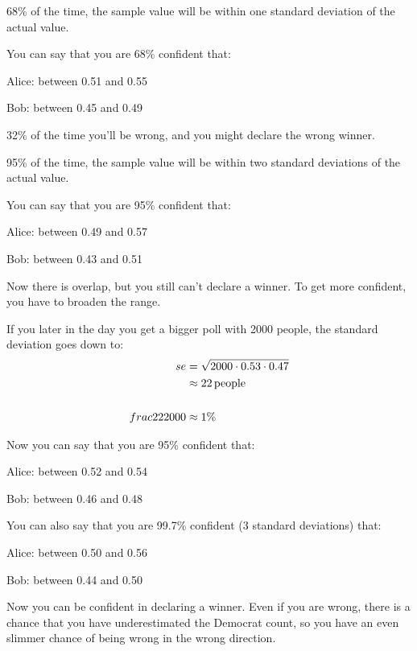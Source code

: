 \documentclass[landscape]{exam}
\begin{document}
  68\% of the time, the sample value will be within one standard deviation of
  the actual value. 
  
  You can say that you are 68\% confident that:
  \begin{itemize*}
    \item Alice: between 0.51 and 0.55
    \item Bob: between 0.45 and 0.49
  \end{itemize*}

  32\% of the time you'll be wrong, and you might declare the wrong winner.

  95\% of the time, the sample value will be within two standard deviations of
  the actual value. 
  
  You can say that you are 95\% confident that:
  \begin{itemize*}
    \item Alice: between 0.49 and 0.57
    \item Bob: between 0.43 and 0.51
  \end{itemize*}

  Now there is overlap, but you still can't declare a winner. To get more
  confident, you have to broaden the range.

  If you later in the day you get a bigger poll with 2000 people, the standard
  deviation goes down to:
  \begin{align*}
    se & = \sqrt{2000 \cdot 0.53 \cdot 0.47} \\
       & \approx \unit[22]{people} \\
       \\
    frac{22}{2000} &\approx 1\%
  \end{align*}

  Now you can say that you are 95\% confident that:
  \begin{itemize*}
    \item Alice: between 0.52 and 0.54
    \item Bob: between 0.46 and 0.48
  \end{itemize*}

  You can also say that you are 99.7\% confident (3 standard deviations) that:
  \begin{itemize*}
    \item Alice: between 0.50 and 0.56
    \item Bob: between 0.44 and 0.50
  \end{itemize*}

  Now you can be confident in declaring a winner. Even if you are wrong, there
  is a chance that you have underestimated the Democrat count, so you have an
  even slimmer chance of being wrong in the wrong direction.
\end{document}

